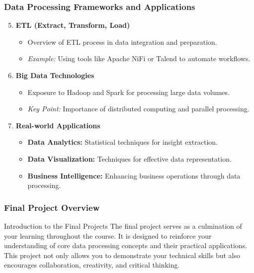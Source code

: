 \documentclass[aspectratio=169]{beamer}
\begin{document}
\begin{frame}[fragile]
    \frametitle{Data Processing Frameworks and Applications}
    \begin{enumerate}
        \setcounter{enumi}{4} %
        \item \textbf{ETL (Extract, Transform, Load)}
            \begin{itemize}
                \item Overview of ETL process in data integration and preparation.
                \item \textit{Example:} Using tools like Apache NiFi or Talend to automate workflows.
            \end{itemize}

        \item \textbf{Big Data Technologies}
            \begin{itemize}
                \item Exposure to Hadoop and Spark for processing large data volumes.
                \item \textit{Key Point:} Importance of distributed computing and parallel processing.
            \end{itemize}

        \item \textbf{Real-world Applications}
            \begin{itemize}
                \item \textbf{Data Analytics:} Statistical techniques for insight extraction.
                \item \textbf{Data Visualization:} Techniques for effective data representation.
                \item \textbf{Business Intelligence:} Enhancing business operations through data processing.
            \end{itemize}
    \end{enumerate}
\end{frame}

\begin{frame}[fragile]
    \frametitle{Final Project Overview}
    
    \begin{block}{Introduction to the Final Projects}
        The final project serves as a culmination of your learning throughout the course. 
        It is designed to reinforce your understanding of core data processing concepts and their practical applications. 
        This project not only allows you to demonstrate your technical skills but also encourages collaboration, creativity, and critical thinking.
    \end{block}
\end{frame}
\end{document}
